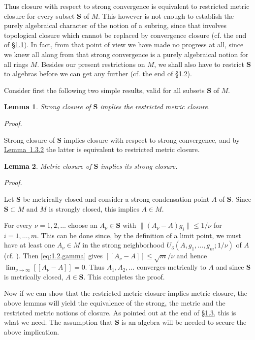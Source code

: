 \documentclass[b5paper,twoside]{article}
\newcommand{\secref}[2]{\hyperref[#1]{\mbox{\S#2}}}
\newcommand{\lemref}[2]{\hyperref[#1]{\mbox{Lemma~#2}}}
\theoremstyle{mvnplain}
\newtheorem{lemma}{Lemma}[section]
\renewenvironment{proof}[1][Proof]{%
  \par\addvspace{0.35\baselineskip}%
  \noindent\textit{#1.}\ \normalfont\ignorespaces
}{%
  \par\addvspace{0.35\baselineskip}%
}
\newcommand{\M}{\mathbf M}
\newcommand{\Metric}[1]{\left[\!\left[#1\right]\!\right]}
\def\M{M}%
\def\Metric#1{[[#1]]}%
\begin{document}
Thus closure with respect to strong convergence is equivalent to restricted
metric closure for every subset $\mathbf S$ of $\M$.  This however is not enough
to establish the purely algebraical character of the notion of a subring, since
that involves topological closure which cannot be replaced by convergence
closure (cf. the end of \secref{sec:1.1}{1.1}).  In fact, from that point of view
we have made no progress at all, since we knew all along from \cite{ref9} that
strong convergence is a purely algebraical notion for all rings $\M$.  Besides
our present restrictions on $\M$, we shall also have to restrict $\mathbf S$ to
algebras before we can get any further (cf. the end of \secref{sec:1.2}{1.2}).

Consider first the following two simple results, valid for all subsets
$\mathbf S$ of $\M$.
\begin{lemma}\label{lem:1.4.1}
Strong closure of $\mathbf S$ implies the restricted metric closure.
\end{lemma}
\begin{proof}
Strong closure of $\mathbf S$ implies closure with respect to strong convergence,
and by \lemref{lem:1.3.2}{1.3.2} the latter is equivalent to restricted metric
closure.
\end{proof}

\begin{lemma}\label{lem:1.4.2}
Metric closure of $\mathbf S$ implies its strong closure.
\end{lemma}
\begin{proof}
Let $\mathbf S$ be metrically closed and consider a strong condensation point
$A$ of $\mathbf S$.  Since $\mathbf S\subset\M$ and $\M$ is strongly closed,
this implies $A\in\M$.

For every $\nu=1,2,\ldots$ choose an $A_\nu\in\mathbf S$ with
$\lVert(A_\nu-A)g_i\rVert\leq1/\nu$ for $i=1,\ldots,m$.  This can be done
since, by the definition of a limit point, we must have at least one
$A_\nu\in\M$ in the strong neighborhood
$U_3(A,g_1,\ldots,g_m;1/\nu)$ of $A$ (cf. \cite[\S2, p.~381]{ref2}).  Then
\eqref{eq:1.2.gamma} gives
$\Metric{A_\nu-A}\leq\sqrt{m}/\nu$ and hence
$\lim_{\nu\to\infty}\Metric{A_\nu-A}=0$.  Thus $A_1,A_2,\ldots$ converges
metrically to $A$ and since $\mathbf S$ is metrically closed, $A\in\mathbf S$.
This completes the proof.
\end{proof}

Now if we can show that the restricted metric closure implies metric closure,
the above lemmas will yield the equivalence of the strong, the metric and the
restricted metric notions of closure.  As pointed out at the end of
\secref{sec:1.3}{1.3}, this is what we need.  The assumption that $\mathbf S$ is
an algebra will be needed to secure the above implication.
\end{document}
